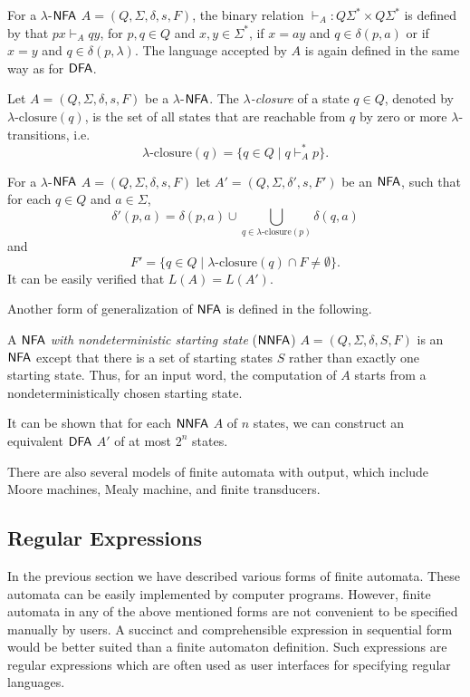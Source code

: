 For a \index{$\lambda$-$\NFA$}$\lambda$-$\NFA$ $A = (Q, \Sigma, \delta, s, F)$, the binary relation $\vdash_A: Q \Sigma^* \times Q \Sigma^*$ is defined by that $px \vdash_A qy$, for $p, q \in Q$ and $x, y \in \Sigma^*$, if $x = ay$ and $q \in \delta(p, a)$ or if $x = y$ and $q \in \delta(p, \lambda)$. The language accepted by $A$ is again defined in the same way as for \index{$\DFA$}$\DFA$.

Let $A = (Q, \Sigma, \delta, s, F)$ be a \index{$\lambda$-$\NFA$}$\lambda$-$\NFA$. The \emph{$\lambda$-closure} of a state $q \in Q$, denoted by $\lambda \text{-closure}(q)$, is the set of all states that are reachable from $q$ by zero or more $\lambda$-transitions, i.e. $$\lambda \text{-closure}(q) = \{q \in Q \mid q \vdash_A^* p \}.$$

For a \index{$\lambda$-$\NFA$}$\lambda$-$\NFA$ $A = (Q, \Sigma, \delta, s, F)$ let $A' = (Q, \Sigma, \delta', s, F')$ be an \index{$\NFA$}$\NFA$, such that for each $q \in Q$ and $a \in \Sigma$, $$\delta'(p, a) = \delta(p, a) \cup \bigcup_{q \in \lambda \text{-closure}(p)}\delta(q, a)$$ and $$F' = \{ q \in Q \mid \lambda\text{-closure}(q) \cap F \neq \emptyset \}.$$ It can be easily verified that $L(A) = L(A')$.

Another form of generalization of \index{$\NFA$}$\NFA$ is defined in the following.

A \emph{$\NFA$ with nondeterministic starting state} \index{$\NNFA$}($\NNFA$) $A = (Q, \Sigma, \delta, S, F)$ is an \index{$\NFA$}$\NFA$ except that there is a set of starting states $S$ rather than exactly one starting state. Thus, for an input word, the computation of $A$ starts from a nondeterministically chosen starting state.

It can be shown that for each $\NNFA$ $A$ of $n$ states, we can construct an equivalent \index{$\DFA$}$\DFA$ $A'$ of at most $2^n$ states.

There are also several models of finite automata with output, which include Moore machines, Mealy machine, and finite transducers.

\subsection{Regular Expressions}
\label{subsection:regular-expressions}

In the previous section we have described various forms of finite automata. These automata can be easily implemented by computer programs. However, finite automata in any of the above mentioned forms are not convenient to be specified manually by users. A succinct and comprehensible expression in sequential form would be better suited than a finite automaton definition. Such expressions are regular expressions which are often used as user interfaces for specifying regular languages.

